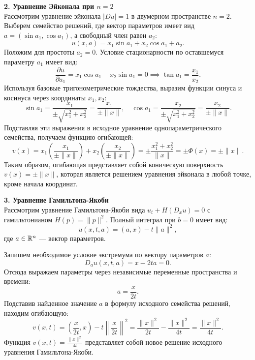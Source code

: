 \textbf{2. Уравнение Эйконала при $n = 2$}\\
Рассмотрим уравнение эйконала $|Du| = 1$ в двумерном пространстве $n=2$. 
Выберем семейство решений, где вектор параметров имеет вид 
$a = (\sin a_1, \cos a_1)$, а свободный член равен $a_2$:
\begin{equation}
    u(x, a) = x_1 \sin a_1 + x_2 \cos a_1 + a_2.
\end{equation}
Положим для простоты $a_2 = 0$. Условие стационарности по оставшемуся 
параметру $a_1$ имеет вид:
\begin{equation}
    \frac{\partial u}{\partial a_1} = x_1 \cos a_1 - x_2 \sin a_1 = 0 \implies \tan a_1 = \frac{x_1}{x_2}.
\end{equation}
Используя базовые тригонометрические тождества, выразим функции синуса и косинуса 
через координаты $x_1, x_2$: 
\begin{equation}
    \sin a_1 = \frac{x_1}{\pm \sqrt{x_1^2 + x_2^2}} = \frac{x_1}{\pm \|x\|}, \quad \cos a_1 = \frac{x_2}{\pm \sqrt{x_1^2 + x_2^2}} = \frac{x_2}{\pm \|x\|}.
\end{equation}
Подставляя эти выражения в исходное уравнение однопараметрического семейства, 
получаем функцию огибающей:
\begin{equation}
    v(x) = x_1 \left( \frac{x_1}{\pm \|x\|} \right) + x_2 \left( \frac{x_2}{\pm \|x\|} \right) = \pm \frac{x_1^2 + x_2^2}{\|x\|} = \pm \varPhi(x) = \pm \|x\|.
\end{equation}
Таким образом, огибающая представляет собой коническую поверхность 
$v(x) = \pm \|x\|$, которая является решением уравнения эйконала в любой точке, 
кроме начала координат.

\textbf{3. Уравнение Гамильтона-Якоби}\\
Рассмотрим уравнение Гамильтона-Якоби вида $u_t + H(D_x u) = 0$ с 
гамильтонианом $H(p) = \|p\|^2$. Полный интеграл при $b = 0$ имеет вид:
\begin{equation}
    u(x, t, a) = (a, x) - t \|a\|^2,
\end{equation}
где $a \in \mathbb{R}^n$ --- вектор параметров.

Запишем необходимое условие экстремума по вектору параметров $a$:
\begin{equation}
    D_a u(x, t, a) = x - 2t a = 0.
\end{equation}
Отсюда выражаем параметры через независимые переменные пространства и времени:
\begin{equation}
    a = \frac{x}{2t}.
\end{equation}
Подставив найденное значение $a$ в формулу исходного семейства решений, 
находим огибающую:
\begin{equation}
    v(x, t) = \left( \frac{x}{2t}, x \right) - t \left\| \frac{x}{2t} \right\|^2 = \frac{\|x\|^2}{2t} - \frac{\|x\|^2}{4t} = \frac{\|x\|^2}{4t}.
\end{equation}
Функция $v(x, t) = \frac{\|x\|^2}{4t}$ представляет собой новое решение исходного уравнения Гамильтона-Якоби.

